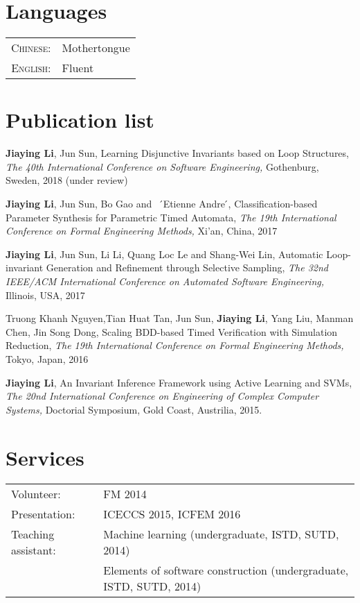 \documentclass[a4paper,10pt]{article}
\begin{document}
\section{Languages}
\begin{tabular}{rl}
	\textsc{Chinese:}&Mothertongue\\
	\textsc{English:}&Fluent\\
\end{tabular}






\section{Publication list}

\textbf{Jiaying Li}, Jun Sun, Learning Disjunctive Invariants based on Loop Structures, {\sl The 40th International Conference on Software Engineering,} Gothenburg, Sweden, 2018 (under review)

\textbf{Jiaying Li}, Jun Sun, Bo Gao and ~ ́Etienne Andre ́, Classification-based Parameter Synthesis for Parametric Timed Automata, {\sl The 19th International Conference on Formal Engineering Methods,} Xi'an, China, 2017

\textbf{Jiaying Li}, Jun Sun, Li Li, Quang Loc Le and Shang-Wei Lin, Automatic Loop-invariant Generation and Refinement through Selective Sampling, {\sl The 32nd IEEE/ACM International Conference on Automated Software Engineering,} Illinois, USA, 2017

Truong Khanh Nguyen,Tian Huat Tan, Jun Sun, \textbf{Jiaying Li}, Yang Liu, Manman Chen, Jin Song Dong, Scaling BDD-based Timed Verification with Simulation Reduction, {\sl The 19th International Conference on Formal Engineering Methods,} Tokyo, Japan, 2016 

\textbf{Jiaying Li}, An Invariant Inference Framework using Active Learning and SVMs, {\sl The 20nd International Conference on Engineering of Complex Computer Systems,} Doctorial Symposium, Gold Coast, Austrilia, 2015.








\section{Services}
\begin{tabular}{ll}
Volunteer:&FM 2014\\
Presentation: &ICECCS 2015, ICFEM 2016\\
Teaching assistant:&Machine learning (undergraduate, ISTD, SUTD, 2014)\\
&Elements of software construction (undergraduate, ISTD, SUTD, 2014)
\end{tabular}
\end{document}
